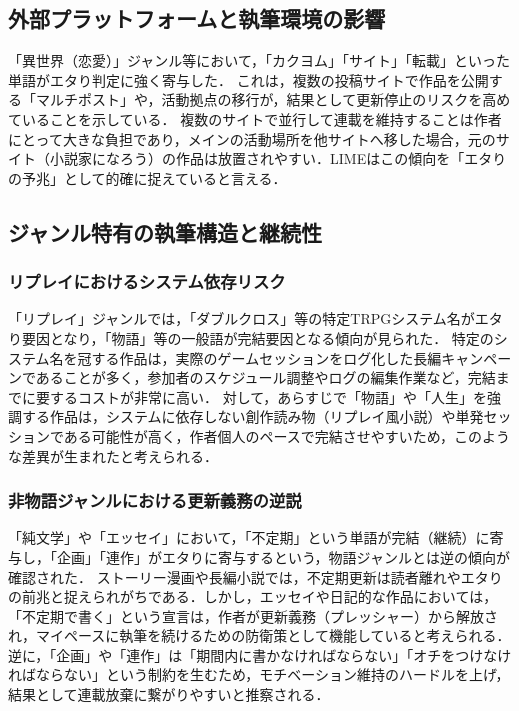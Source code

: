 \documentclass[uplatex, dvipdfmx, 11pt, a4paper, report]{jsbook}
\begin{document}
\subsection{外部プラットフォームと執筆環境の影響}
「異世界（恋愛）」ジャンル等において，「カクヨム」「サイト」「転載」といった単語がエタり判定に強く寄与した．
これは，複数の投稿サイトで作品を公開する「マルチポスト」や，活動拠点の移行が，結果として更新停止のリスクを高めていることを示している．
複数のサイトで並行して連載を維持することは作者にとって大きな負担であり，メインの活動場所を他サイトへ移した場合，元のサイト（小説家になろう）の作品は放置されやすい．LIMEはこの傾向を「エタりの予兆」として的確に捉えていると言える．

\subsection{ジャンル特有の執筆構造と継続性}

\subsubsection*{リプレイにおけるシステム依存リスク}
「リプレイ」ジャンルでは，「ダブルクロス」等の特定TRPGシステム名がエタり要因となり，「物語」等の一般語が完結要因となる傾向が見られた．
特定のシステム名を冠する作品は，実際のゲームセッションをログ化した長編キャンペーンであることが多く，参加者のスケジュール調整やログの編集作業など，完結までに要するコストが非常に高い．
対して，あらすじで「物語」や「人生」を強調する作品は，システムに依存しない創作読み物（リプレイ風小説）や単発セッションである可能性が高く，作者個人のペースで完結させやすいため，このような差異が生まれたと考えられる．

\subsubsection*{非物語ジャンルにおける更新義務の逆説}
「純文学」や「エッセイ」において，「不定期」という単語が完結（継続）に寄与し，「企画」「連作」がエタりに寄与するという，物語ジャンルとは逆の傾向が確認された．
ストーリー漫画や長編小説では，不定期更新は読者離れやエタりの前兆と捉えられがちである．しかし，エッセイや日記的な作品においては，「不定期で書く」という宣言は，作者が更新義務（プレッシャー）から解放され，マイペースに執筆を続けるための防衛策として機能していると考えられる．
逆に，「企画」や「連作」は「期間内に書かなければならない」「オチをつけなければならない」という制約を生むため，モチベーション維持のハードルを上げ，結果として連載放棄に繋がりやすいと推察される．
\end{document}
